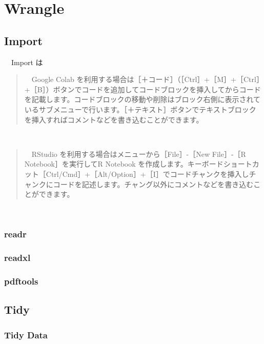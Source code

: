 \documentclass[
  12pt,
]{book}
\begin{document}
\hypertarget{part-wrangle}{%
\part{Wrangle}\label{part-wrangle}}

\hypertarget{import-1}{%
\chapter{Import}\label{import-1}}

　Import は

\begin{quote}
　Google Colab を利用する場合は［＋コード］（［Ctrl］+［M］+［Ctrl］+［B］）ボタンでコードを追加してコードブロックを挿入してからコードを記載します。コードブロックの移動や削除はブロック右側に表示されているサブメニューで行います。［＋テキスト］ボタンでテキストブロックを挿入すればコメントなどを書き込むことができます。
\end{quote}

　

\begin{quote}
　RStudio を利用する場合はメニューから［File］-［New File］-［R Notebook］を実行してR Notebook を作成します。キーボードショートカット［Ctrl/Cmd］+［Alt/Option］+［I］でコードチャンクを挿入しチャンクにコードを記述します。チャング以外にコメントなどを書き込むことができます。
\end{quote}

　

\hypertarget{readr}{%
\section{readr}\label{readr}}

\hypertarget{readxl}{%
\section{readxl}\label{readxl}}

\hypertarget{pdftools}{%
\section{pdftools}\label{pdftools}}

\hypertarget{tidy-1}{%
\chapter{Tidy}\label{tidy-1}}

\hypertarget{tidy-data}{%
\section{Tidy Data}\label{tidy-data}}
\end{document}
